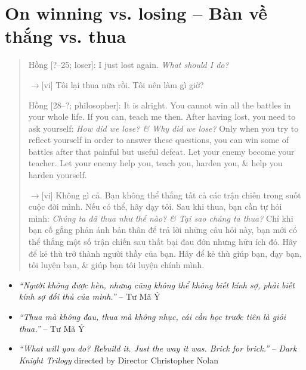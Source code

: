 \documentclass[12pt,twoside]{book}
\begin{document}
\section{On winning vs. losing -- Bàn về thắng vs. thua}

\begin{quote}
	{\sf Hồng [?--25; loser]}: I just lost again. {\it What should I do?}
	
	{\sf[en]$\to$[vi]} Tôi lại thua nữa rồi. Tôi nên làm gì giờ?
	
	{\sf Hồng [28--?; philosopher]}: It is alright. You cannot win all the battles in your whole life. If you can, teach me then. After having lost, you need to ask yourself: {\it How did we lose? \& Why did we lose?} Only when you try to reflect yourself in order to answer these questions, you can win some of battles after that painful but useful defeat. Let your enemy become your teacher. Let your enemy help you, teach you, harden you, \& help you harden yourself.
	
	{\sf[en]$\to$[vi]} Không gì cả. Bạn không thể thắng tất cả các trận chiến trong suốt cuộc đời mình. Nếu có thể, hãy dạy tôi. Sau khi thua, bạn cần tự hỏi mình: {\it Chúng ta đã thua như thế nào? \& Tại sao chúng ta thua?} Chỉ khi bạn cố gắng phản ánh bản thân để trả lời những câu hỏi này, bạn mới có thể thắng một số trận chiến sau thất bại đau đớn nhưng hữu ích đó. Hãy để kẻ thù trở thành người thầy của bạn. Hãy để kẻ thù giúp bạn, dạy bạn, tôi luyện bạn, \& giúp bạn tôi luyện chính mình.
\end{quote}

\begin{itemize}
	\item {\sf[cn$\to$vi]} {\it``Người không được hèn, nhưng cũng không thể không biết kính sợ, phải biết kính sợ đối thủ của mình.''} -- {\sc Tư Mã Ý}
	
	\item {\sf[cn$\to$vi]} {\it``Thua mà không đau, thua mà không nhục, cái cần học trước tiên là giỏi thua.''} -- {\sc Tư Mã Ý}
	
	\item {\it``What will you do? Rebuild it. Just the way it was. Brick for brick.''} -- {\it Dark Knight Trilogy} directed by Director {\sc Christopher Nolan}
\end{itemize}

\end{document}
